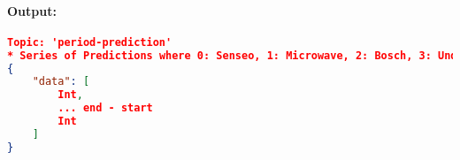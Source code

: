                 \paragraph{Output:}
            
                \begin{lstlisting}[language=json,firstnumber=1]
Topic: 'period-prediction'
* Series of Predictions where 0: Senseo, 1: Microwave, 2: Bosch, 3: Undefined, for every second
{
    "data": [
        Int,
        ... end - start
        Int
    ]
}
                \end{lstlisting}
